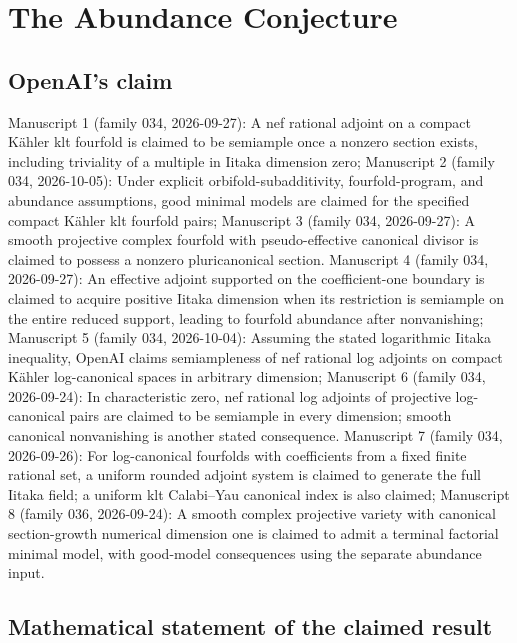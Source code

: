 \documentclass[11pt]{article}
\begin{document}
\section*{The Abundance Conjecture}

\subsection{OpenAI's claim}
Manuscript 1 (family 034, 2026-09-27): A nef rational adjoint on a compact Kähler klt fourfold is claimed to be semiample once a nonzero section exists, including triviality of a multiple in Iitaka dimension zero; Manuscript 2 (family 034, 2026-10-05): Under explicit orbifold-subadditivity, fourfold-program, and abundance assumptions, good minimal models are claimed for the specified compact Kähler klt fourfold pairs; Manuscript 3 (family 034, 2026-09-27): A smooth projective complex fourfold with pseudo-effective canonical divisor is claimed to possess a nonzero pluricanonical section. Manuscript 4 (family 034, 2026-09-27): An effective adjoint supported on the coefficient-one boundary is claimed to acquire positive Iitaka dimension when its restriction is semiample on the entire reduced support, leading to fourfold abundance after nonvanishing; Manuscript 5 (family 034, 2026-10-04): Assuming the stated logarithmic Iitaka inequality, OpenAI claims semiampleness of nef rational log adjoints on compact Kähler log-canonical spaces in arbitrary dimension; Manuscript 6 (family 034, 2026-09-24): In characteristic zero, nef rational log adjoints of projective log-canonical pairs are claimed to be semiample in every dimension; smooth canonical nonvanishing is another stated consequence. Manuscript 7 (family 034, 2026-09-26): For log-canonical fourfolds with coefficients from a fixed finite rational set, a uniform rounded adjoint system is claimed to generate the full Iitaka field; a uniform klt Calabi--Yau canonical index is also claimed; Manuscript 8 (family 036, 2026-09-24): A smooth complex projective variety with canonical section-growth numerical dimension one is claimed to admit a terminal factorial minimal model, with good-model consequences using the separate abundance input.

\subsection{Mathematical statement of the claimed result}
\end{document}
